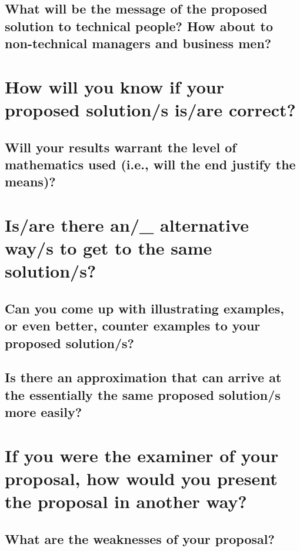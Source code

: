 \blindtext
					  
\subsection{What will be the message of the proposed solution to technical people?  How about to non-technical managers and business men?}
			
\blindtext





\section{How will you know if your proposed solution/s is/are correct?}

\blindtext 
			
\subsection{Will your results warrant the level of mathematics used (i.e., will the end justify the means)?}
	    
\blindtext
			





\section{Is/are there an/\_ alternative way/s to get to the same solution/s?}

\blindtext
	
\subsection{Can you come up with illustrating examples, or even better, counter examples to your proposed solution/s?}

\blindtext
	
\subsection{Is there an approximation that can arrive at the essentially the same proposed solution/s more easily?}
	
\blindtext
			
	
	
	
	
\section{If you were the examiner of your proposal, how would you present the proposal in another way?}
	
\blindtext
	
	
\subsection{What are the weaknesses of your proposal?}

\blindtext
